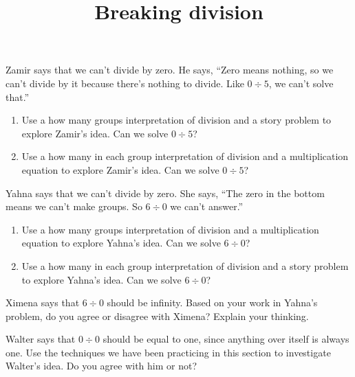 \documentclass[nooutcomes,noauthor, handout]{ximera}
\title{Breaking division}
\begin{document}
\begin{abstract}
\end{abstract}

\maketitle

\begin{problem}
Zamir says that we can't divide by zero. He says, ``Zero means nothing, so we can't divide by it because there's nothing to divide. Like $0 \div 5$, we can't solve that.''

\begin{enumerate}
	\item Use a how many groups interpretation of division and a story problem to explore Zamir's idea. Can we solve $0 \div 5$?
	\item Use a how many in each group interpretation of division and a multiplication equation to explore Zamir's idea. Can we solve $0 \div 5$?
\end{enumerate}
\end{problem}



\begin{problem}
Yahna says that we can't divide by zero. She says, ``The zero in the bottom means we can't make groups. So $6 \div 0$ we can't answer.''
\begin{enumerate}
	\item Use a how many groups interpretation of division and a multiplication equation to explore Yahna's idea. Can we solve $6 \div 0$?
	\item Use a how many in each group interpretation of division and a story problem to explore Yahna's idea. Can we solve $6 \div 0$?
\end{enumerate}
\end{problem}



\begin{problem}
Ximena says that $6 \div 0$ should be infinity. Based on your work in Yahna's problem, do you agree or disagree with Ximena? Explain your thinking.
\end{problem}



\begin{problem}
Walter says that $0 \div 0$ should be equal to one, since anything over itself is always one. Use the techniques we have been practicing in this section to investigate Walter's idea. Do you agree with him or not?
\end{problem}
\end{document}
